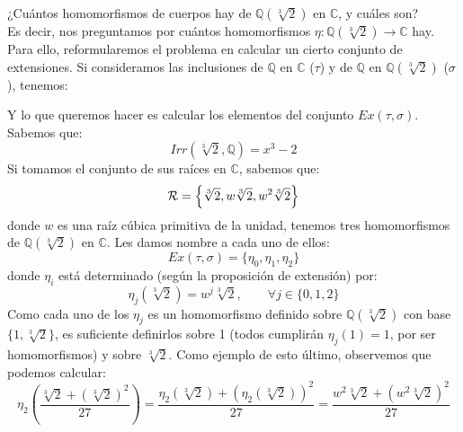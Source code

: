 \begin{ejemplo}
    ¿Cuántos homomorfismos de cuerpos hay de $\mathbb{Q}(\sqrt[3]{2})$ en $\mathbb{C}$, y cuáles son?\\

    \noindent
    Es decir, nos preguntamos por cuántos homomorfismos $\eta:\mathbb{Q}\left(\sqrt[3]{2}\right)\to \mathbb{C}$ hay. Para ello, reformularemos el problema en calcular un cierto conjunto de extensiones. Si consideramos las inclusiones de $\mathbb{Q}$ en $\mathbb{C}$ ($\tau$) y de $\mathbb{Q}$ en $\mathbb{Q}\left(\sqrt[3]{2}\right)$ ($\sigma$), tenemos:
    \begin{figure}[H]
        \centering
    \end{figure}
    \noindent
    Y lo que queremos hacer es calcular los elementos del conjunto $Ex(\tau,\sigma)$. Sabemos que:
    \begin{equation*}
        Irr\left(\sqrt[3]{2},\mathbb{Q}\right) = x^3-2
    \end{equation*}
    Si tomamos el conjunto de sus raíces en $\mathbb{C}$, sabemos que:
    \begin{equation*}
        \mathcal{R} = \left\{\sqrt[3]{2}, w\sqrt[3]{2}, w^2\sqrt[3]{2}\right\}
    \end{equation*}
    donde $w$ es una raíz cúbica primitiva de la unidad, tenemos tres homomorfismos de $\mathbb{Q}(\sqrt[3]{2})$ en $\mathbb{C}$. Les damos nombre a cada uno de ellos:
    \begin{equation*}
        Ex(\tau,\sigma) = \{\eta_0,\eta_1,\eta_2\}
    \end{equation*}
    donde $\eta_i$ está determinado (según la proposición de extensión) por:
    \begin{equation*}
        \eta_j\left(\sqrt[3]{2}\right) = w^j \sqrt[3]{2}, \qquad \forall j \in \{0,1,2\}
    \end{equation*}
    Como cada uno de los $\eta_j$ es un homomorfismo definido sobre $\mathbb{Q}\left(\sqrt[3]{2}\right)$ con base $\{1,\sqrt[3]{2}\}$, es suficiente definirlos sobre 1 (todos cumplirán $\eta_j(1)=1$, por ser homomorfismos) y sobre $\sqrt[3]{2}$. Como ejemplo de esto último, observemos que podemos calcular:
    \begin{equation*}
        \eta_2\left(\frac{{\sqrt[3]{2}+(\sqrt[3]{2})}^{2}}{27}\right) = \dfrac{\eta_2(\sqrt[3]{2}) + {\left(\eta_2\left(\sqrt[3]{2}\right)\right)}^{2}}{27} = \dfrac{w^2 \sqrt[3]{2} + {\left(w^2\sqrt[3]{2}\right)}^{2}}{27} 
    \end{equation*} 
\end{ejemplo}

